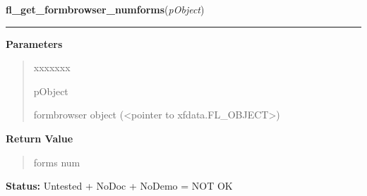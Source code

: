     \label{xformslib:library:fl_get_formbrowser_numforms}

    \vspace{0.5ex}

\hspace{.8\funcindent}\begin{boxedminipage}{\funcwidth}

    \raggedright \textbf{fl\_get\_formbrowser\_numforms}(\textit{pObject})

    \vspace{-1.5ex}

    \rule{\textwidth}{0.5\fboxrule}
\setlength{\parskip}{2ex}
\setlength{\parskip}{1ex}
      \textbf{Parameters}
      \vspace{-1ex}

      \begin{quote}
        \begin{Ventry}{xxxxxxx}

          \item[pObject]

          formbrowser object ({\textless}pointer to 
          xfdata.FL\_OBJECT{\textgreater})

        \end{Ventry}

      \end{quote}

      \textbf{Return Value}
    \vspace{-1ex}

      \begin{quote}
      forms num

      \end{quote}

\textbf{Status:} Untested + NoDoc + NoDemo = NOT OK



    \end{boxedminipage}

    \label{xformslib:library:fl_get_formbrowser_form}

    \vspace{0.5ex}

